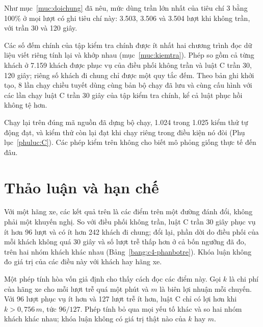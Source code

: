 Như mục~\ref{muc:doichung} đã nêu, mức dùng trần lớn nhất của tiêu chí 3 bằng 100\% ở mọi lượt có ghi tiêu chí này:
3.503, 3.506 và 3.504 lượt khi không trần, với trần 30 và 120 giây.

Các số đếm chính của tập kiểm tra chính được ít nhất hai chương trình đọc dữ liệu viết riêng tính lại và khớp nhau
(mục~\ref{muc:kiemtra}). Phép so gồm cả từng khách ở 7.159 khách được phục vụ của điều phối không trần và luật C trần
30, 120 giây; riêng số khách đi chung chỉ được một quy tắc đếm. Theo bản ghi khởi tạo, 8 lần chạy chiều tuyết dùng cùng
bản bộ chạy đã lưu và cùng cấu hình với các lần chạy luật C trần 30 giây của tập kiểm tra chính, kể cả luật phục hồi
không tệ hơn.

Chạy lại trên đúng mã nguồn đã dựng bộ chạy, 1.024 trong 1.025 kiểm thử tự động đạt, và kiểm thử còn lại đạt khi chạy
riêng trong điều kiện nó đòi (Phụ lục~\ref{phuluc:C}). Các phép kiểm trên không cho biết mô phỏng giống thực tế đến
đâu.

\section{Thảo luận và hạn chế}
\label{muc:c4-thaoluan}

Với một hãng xe, các kết quả trên là các điểm trên một đường đánh đổi, không phải một khuyến nghị. So với điều phối
không trần, luật C trần 30 giây phục vụ ít hơn 96 lượt và có ít hơn 242 khách đi chung; đổi lại, phần dời do điều phối
của mỗi khách không quá 30 giây và số lượt trễ thấp hơn ở cả bốn ngưỡng đã đo, trên hai nhóm khách khác nhau
(Bảng~\ref{bang:c4-phanbotre}). Khóa luận không đo giá trị của các điều này với khách hay hãng xe.

Một phép tính hòa vốn giả định cho thấy cách đọc các điểm này. Gọi $k$ là chi phí của hãng xe cho mỗi lượt trễ quá một
phút và $m$ là biên lợi nhuận mỗi chuyến. Với 96 lượt phục vụ ít hơn và 127 lượt trễ ít hơn, luật C chỉ có lợi hơn khi
$k > 0{,}756\,m$, tức $96/127$. Phép tính bỏ qua mọi yếu tố khác và so hai nhóm khách khác nhau; khóa luận không có giá trị thật
nào của $k$ hay $m$.

